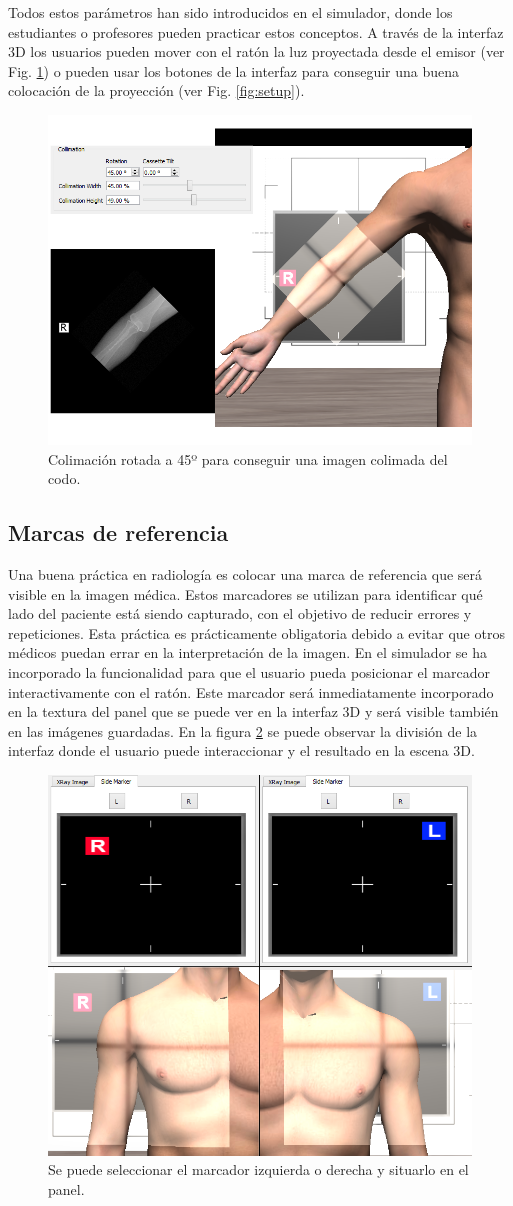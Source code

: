 Todos estos parámetros han sido introducidos en el simulador, donde los estudiantes o profesores pueden practicar estos conceptos. A través de la interfaz 3D los usuarios pueden mover con el ratón la luz proyectada desde el emisor (ver Fig. \ref{fig:collimation}) o pueden usar los botones de la interfaz para conseguir una buena colocación de la proyección (ver Fig. \ref{fig:setup}).


\begin{figure}[tb]
\centering
\includegraphics[width=0.5\linewidth]{IMG/collimation.png}
\caption{\label{fig:collimation} Colimación rotada a 45º para conseguir una imagen colimada del codo.}
\end{figure}


\subsection{Marcas de referencia}
\label{xray:sidemark}
Una buena práctica en radiología es colocar una marca de referencia que será visible en la imagen médica. Estos marcadores se utilizan para identificar qué lado del paciente está siendo capturado, con el objetivo de reducir errores y repeticiones. Esta práctica es prácticamente obligatoria debido a evitar que otros médicos puedan errar en la interpretación de la imagen. En el simulador se ha incorporado la funcionalidad para que el usuario pueda posicionar el marcador interactivamente con el ratón. Este marcador será inmediatamente incorporado en la textura del panel que se puede ver en la interfaz 3D y será visible también en las imágenes guardadas. En la figura \ref{fig:side} se puede observar la división de la interfaz donde el usuario puede interaccionar y el resultado en la escena 3D. 



\begin{figure}[h]
\centering
\includegraphics[width=0.5\linewidth]{IMG/side.png}
\caption{\label{fig:side} Se puede seleccionar el marcador izquierda o derecha y situarlo en el panel.}
\end{figure}


